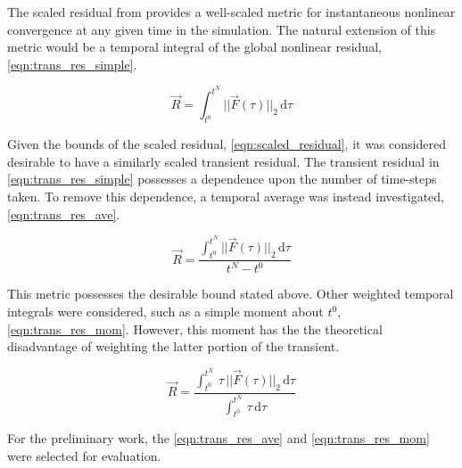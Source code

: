 The scaled residual from  provides a well-scaled metric for instantaneous nonlinear convergence at any given time in the simulation.
The natural extension of this metric would be a temporal integral of the global nonlinear residual, \eqref{eqn:trans_res_simple}.

\begin{equation}
\label{eqn:trans_res_simple}
\vec{R} = \int_{t^{0}}^{t^{N}} ||\vec{F}(\tau)||_2 \,\mathrm{d} \tau
\end{equation}

Given the bounds of the scaled residual, \eqref{eqn:scaled_residual}, it was considered desirable to have a similarly scaled transient residual.
The transient residual in \eqref{eqn:trans_res_simple} possesses a dependence upon the number of time-steps taken.
To remove this dependence, a temporal average was instead investigated, \eqref{eqn:trans_res_ave}.

\begin{equation}
\label{eqn:trans_res_ave}
\vec{R} = \frac{\int_{t^{0}}^{t^{N}} ||\vec{F}(\tau)||_2 \,\mathrm{d} \tau}{t^{N} - t^{0}}
\end{equation}

This metric possesses the desirable bound stated above.
Other weighted temporal integrals were considered, such as a simple moment about $t^{0}$, \eqref{eqn:trans_res_mom}.
However, this moment has the the theoretical disadvantage of weighting the latter portion of the transient.

\begin{equation}
\label{eqn:trans_res_mom}
\vec{R} = \frac{\int_{t^{0}}^{t^{N}} \,\tau\,||\vec{F}(\tau)||_2 \,\mathrm{d} \tau}{\int_{t^{0}}^{t^{N}} \,\tau \,\mathrm{d} \tau}
\end{equation}

For the preliminary work, the \eqref{eqn:trans_res_ave} and \eqref{eqn:trans_res_mom} were selected for evaluation.


